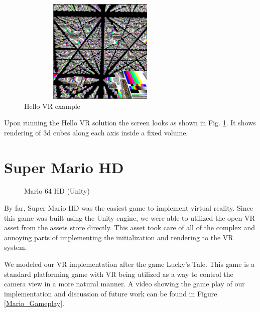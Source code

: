 \documentclass[journal]{IEEEtran}
\begin{document}
\begin{figure}[h]
	\includegraphics[width=8cm, height=5cm]{hellovr} 
	\centering
	\caption{Hello VR example \label{fig:hellovr} \cite{hello_ovr_images}}
\end{figure}


Upon running the Hello VR solution the screen looks as shown in Fig. \ref{fig:hellovr}. It shows rendering of 3d cubes along each axis inside a fixed volume. 
 
\section{Super Mario HD}

\begin{figure}[h]
	\noindent
	\caption{Mario 64 HD (Unity)\cite{mario_header} \label{fig:mario}}
\end{figure}

By far, Super Mario HD\cite{fig:mario} was the easiest game to implement virtual reality. Since this game was built using the Unity engine, we were able to utilized the open-VR asset from the assets store directly. This asset took care of all of the complex and annoying parts of implementing the initialization and rendering to the VR system. 

We modeled our VR implementation after the game Lucky's Tale. This game is a standard platforming game with VR being utilized as a way to control the camera view in a more natural manner.  A video showing the game play of our implementation and discussion of future work can be found in Figure \ref{Mario_Gameplay}.
\end{document}
